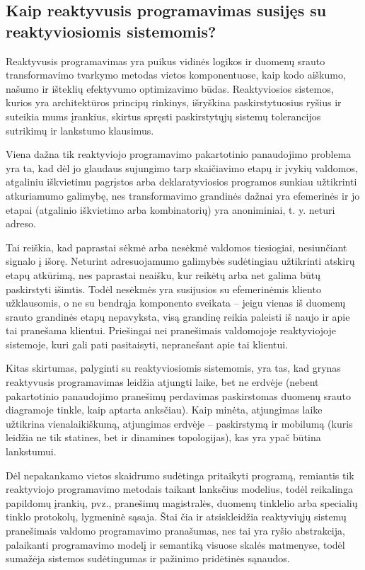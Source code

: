 \subsection{Kaip reaktyvusis programavimas susijęs su reaktyviosiomis sistemomis?}

Reaktyvusis programavimas yra puikus vidinės logikos ir duomenų srauto transformavimo tvarkymo metodas vietos komponentuose, kaip kodo aiškumo, našumo ir išteklių efektyvumo optimizavimo būdas. Reaktyviosios sistemos, kurios yra architektūros principų rinkinys, išryškina paskirstytuosius ryšius ir suteikia mums įrankius, skirtus spręsti paskirstytųjų sistemų tolerancijos sutrikimų ir lankstumo klausimus.

Viena dažna tik reaktyviojo programavimo pakartotinio panaudojimo problema yra ta, kad dėl jo glaudaus sujungimo tarp skaičiavimo etapų ir įvykių valdomos, atgaliniu iškvietimu pagrįstos arba deklaratyviosios programos sunkiau užtikrinti atkuriamumo galimybę, nes transformavimo grandinės dažnai yra efemerinės ir jo etapai (atgalinio iškvietimo arba kombinatorių) yra anoniminiai, t. y. neturi adreso.

Tai reiškia, kad paprastai sėkmė arba nesėkmė valdomos tiesiogiai, nesiunčiant signalo į išorę. Neturint adresuojamumo galimybės sudėtingiau užtikrinti atskirų etapų atkūrimą, nes paprastai neaišku, kur reikėtų arba net galima būtų paskirstyti išimtis. Todėl nesėkmės yra susijusios su efemerinėmis kliento užklausomis, o ne su bendrąja komponento sveikata – jeigu vienas iš duomenų srauto grandinės etapų nepavyksta, visą grandinę reikia paleisti iš naujo ir apie tai pranešama klientui. Priešingai nei pranešimais valdomojoje reaktyviojoje sistemoje, kuri gali pati pasitaisyti, nepranešant apie tai klientui.

Kitas skirtumas, palyginti su reaktyviosiomis sistemomis, yra tas, kad grynas reaktyvusis programavimas leidžia atjungti laike, bet ne erdvėje (nebent pakartotinio panaudojimo pranešimų perdavimas paskirstomas duomenų srauto diagramoje tinkle, kaip aptarta anksčiau). Kaip minėta, atjungimas laike užtikrina vienalaikiškumą, atjungimas erdvėje – paskirstymą ir mobilumą (kuris leidžia ne tik statines, bet ir dinamines topologijas), kas yra ypač būtina lankstumui.

Dėl nepakankamo vietos skaidrumo sudėtinga pritaikyti programą, remiantis tik reaktyviojo programavimo metodais taikant lanksčius modelius, todėl reikalinga papildomų įrankių, pvz., pranešimų magistralės, duomenų tinklelio arba specialių tinklo protokolų, lygmeninė sąsaja. Štai čia ir atsiskleidžia reaktyviųjų sistemų pranešimais valdomo programavimo pranašumas, nes tai yra ryšio abstrakcija, palaikanti programavimo modelį ir semantiką visuose skalės matmenyse, todėl sumažėja sistemos sudėtingumas ir pažinimo pridėtinės sąnaudos.

